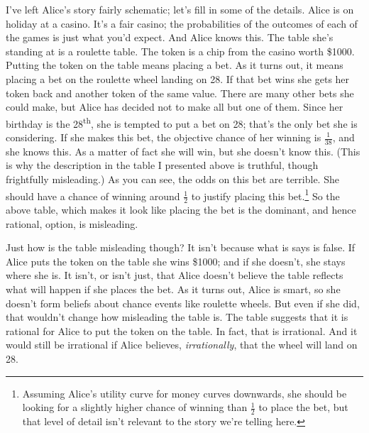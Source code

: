 \documentclass[
  10pt,
  letterpaper,
  DIV=11,
  numbers=noendperiod,
  twoside]{scrartcl}
\begin{document}
I've left Alice's story fairly schematic; let's fill in some of the
details. Alice is on holiday at a casino. It's a fair casino; the
probabilities of the outcomes of each of the games is just what you'd
expect. And Alice knows this. The table she's standing at is a roulette
table. The token is a chip from the casino worth \$1000. Putting the
token on the table means placing a bet. As it turns out, it means
placing a bet on the roulette wheel landing on 28. If that bet wins she
gets her token back and another token of the same value. There are many
other bets she could make, but Alice has decided not to make all but one
of them. Since her birthday is the 28\textsuperscript{th}, she is
tempted to put a bet on 28; that's the only bet she is considering. If
she makes this bet, the objective chance of her winning is
\(\frac{1}{38}\), and she knows this. As a matter of fact she will win,
but she doesn't know this. (This is why the description in the table I
presented above is truthful, though frightfully misleading.) As you can
see, the odds on this bet are terrible. She should have a chance of
winning around \(\frac{1}{2}\) to justify placing this bet.\footnote{Assuming
  Alice's utility curve for money curves downwards, she should be
  looking for a slightly higher chance of winning than \(\frac{1}{2}\)
  to place the bet, but that level of detail isn't relevant to the story
  we're telling here.} So the above table, which makes it look like
placing the bet is the dominant, and hence rational, option, is
misleading.

Just how is the table misleading though? It isn't because what is says
is false. If Alice puts the token on the table she wins \$1000; and if
she doesn't, she stays where she is. It isn't, or isn't just, that Alice
doesn't believe the table reflects what will happen if she places the
bet. As it turns out, Alice is smart, so she doesn't form beliefs about
chance events like roulette wheels. But even if she did, that wouldn't
change how misleading the table is. The table suggests that it is
rational for Alice to put the token on the table. In fact, that is
irrational. And it would still be irrational if Alice believes,
\emph{irrationally}, that the wheel will land on 28.
\end{document}

